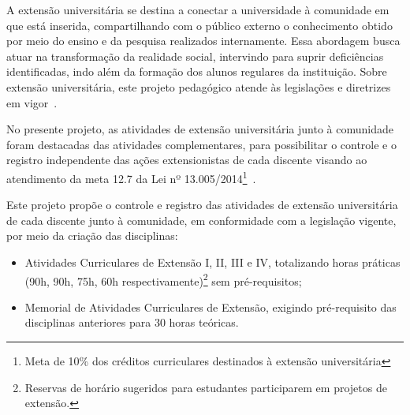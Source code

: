A extensão universitária se destina a conectar a universidade à comunidade em que está inserida, compartilhando com o público externo o conhecimento obtido por meio do ensino e da pesquisa realizados internamente. Essa abordagem busca atuar na transformação da realidade social, intervindo para suprir deficiências identificadas, indo além da formação dos alunos regulares da instituição. Sobre extensão universitária, este projeto pedagógico atende às legislações e diretrizes em vigor~\cite{Lei:13005:2014,MEC:CNE:CES:7:2018,UFU:CONSUN:25:2019,UFU:CONGRAD:13:2019,UFU:CONSEX:5:2020}.


No presente projeto, as atividades de extensão universitária junto à comunidade foram destacadas das atividades complementares, para possibilitar o controle e o registro independente das ações extensionistas de cada discente visando ao atendimento da meta 12.7 da Lei nº 13.005/2014\footnote{Meta de 10\% dos créditos curriculares destinados à extensão universitária}~\cite{Lei:13005:2014}.

Este projeto propõe o controle e registro das atividades de extensão universitária de cada discente junto à comunidade, em conformidade com a legislação vigente, por meio da criação das disciplinas:

\begin{itemize}
    \item Atividades Curriculares de Extensão I, II, III e IV, totalizando horas práticas (90h, 90h, 75h, 60h respectivamente)\footnote{Reservas de horário sugeridos para estudantes participarem em projetos de extensão.} sem pré-requisitos;
    \item Memorial de Atividades Curriculares de Extensão, exigindo pré-requisito das disciplinas anteriores para 30 horas teóricas.
\end{itemize}

